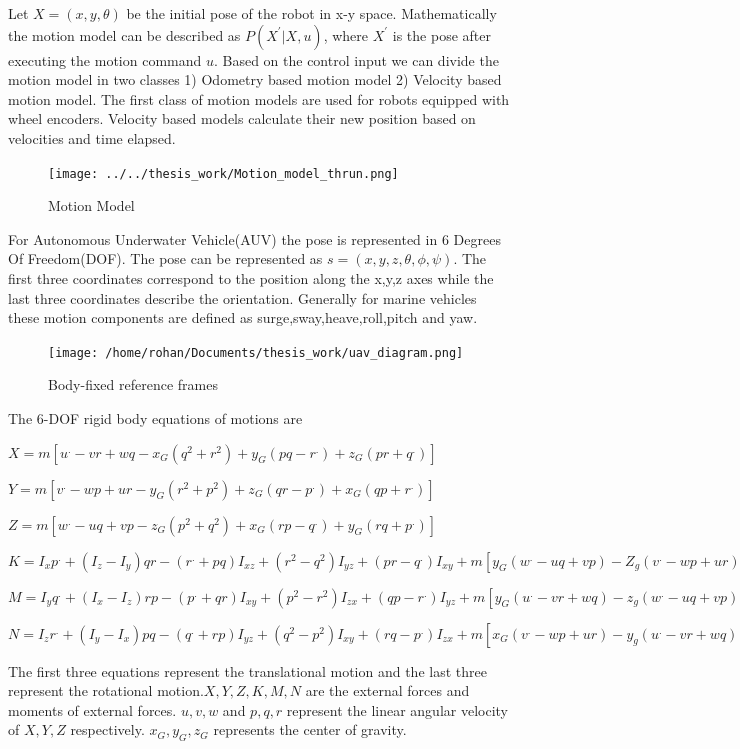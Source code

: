 \documentclass[12pt]{dalcsthesis}
\begin{document}
Let $X=(x,y,\theta)$ be the initial pose of the robot in x-y space.
Mathematically the motion model can be described as $P(X^{'}|X,u)$,
where $X^{'}$ is the pose after executing the motion command $u$.
Based on the control input we can divide the motion model in two classes
1) Odometry based motion model 2) Velocity based motion model. The
first class of motion models are used for robots equipped with wheel
encoders. Velocity based models calculate their new position based
on velocities and time elapsed.
\begin{figure}[hbtp]
\caption{Motion Model}
\centering
\texttt{[image: ../../thesis\_work/Motion\_model\_thrun.png]}
\end{figure}

For Autonomous Underwater Vehicle(AUV) the pose is represented in
6 Degrees Of Freedom(DOF). The pose can be represented as $s=(x,y,z,\theta,\phi,\psi)$.
The first three coordinates correspond to the position along the x,y,z
axes while the last three coordinates describe the orientation. Generally
for marine vehicles these motion components are defined as surge,sway,heave,roll,pitch
and yaw. 

\begin{figure}
\caption{Body-fixed reference frames}


\texttt{[image: /home/rohan/Documents/thesis\_work/uav\_diagram.png]}

\end{figure}


The 6-DOF rigid body equations of motions are 

$X=m[u^{.}-vr+wq-x_{G}(q^{2}+r^{2})+y_{G}(pq-r^{.})+z_{G}(pr+q^{.})]$


$Y=m[v^{.}-wp+ur-y_{G}(r^{2}+p^{2})+z_{G}(qr-p^{.})+x_{G}(qp+r^{.})]$

$Z=m[w^{.}-uq+vp-z_{G}(p^{2}+q^{2})+x_{G}(rp-q^{.})+y_{G}(rq+p^{.})]$

$K=I_{x}p^{.}+(I_{z}-I_{y})qr-(r^{.}+pq)I_{xz}+(r^{2}-q^{2})I_{yz}+(pr-q^{.})I_{xy}+m[y_{G}(w^{.}-uq+vp)-Z_{g}(v^{.}-wp+ur)]$

$M=I_{y}q^{.}+(I_{x}-I_{z})rp-(p^{.}+qr)I_{xy}+(p^{2}-r^{2})I_{zx}+(qp-r^{.})I_{yz}+m[y_{G}(u^{.}-vr+wq)-z_{g}(w^{.}-uq+vp)]$

$N=I_{z}r^{.}+(I_{y}-I_{x})pq-(q^{.}+rp)I_{yz}+(q^{2}-p^{2})I_{xy}+(rq-p^{.})I_{zx}+m[x_{G}(v^{.}-wp+ur)-y_{g}(u^{.}-vr+wq)]$

The first three equations represent the translational motion and the
last three represent the rotational motion.$X,Y,Z,K,M,N$ are the
external forces and moments of external forces. $u,v,w$ and $p,q,r$
represent the linear angular velocity of $X,Y,Z$ respectively. $x_{G},y_{G},z_{G}$
represents the center of gravity.
\end{document}
